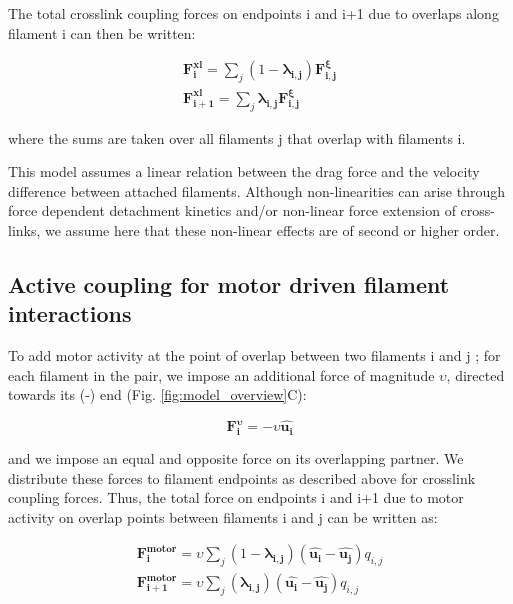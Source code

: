 \documentclass[10pt,letterpaper]{article}
\begin{document}
The total crosslink coupling forces on endpoints i and i+1 due to overlaps along filament i can then be written:

\begin{equation}
\label{eqn: total drag couple}
\begin{aligned}
\mathbf{F^{xl}_{i}} = \sum_j (1 - \mathbf{\lambda_{i,j}}) \mathbf{F^{\xi}_{i,j}} \\
\mathbf{F^{xl}_{i+1}} = \sum_j \mathbf{\lambda_{i,j}} \mathbf{F^{\xi}_{i,j}}
\end{aligned}
\end{equation}

where the sums are taken over all filaments j that overlap with filaments i.  

This model assumes a linear relation between the drag force and the velocity difference between attached filaments.   Although non-linearities can arise through force dependent detachment kinetics and/or non-linear force extension of cross-links, we assume here that these non-linear effects are of second or higher order. 

\subsection*{Active coupling for motor driven filament interactions}

To add motor activity at the point of overlap between two filaments i and j ; for each filament in the pair, we impose an additional force of magnitude $\upsilon$, directed towards its (-) end (Fig. \ref{fig:model_overview}C):

\begin{equation}
\label{eqn:directedmotorforce}
\mathbf{F^{\upsilon}_{i}}=-\upsilon \mathbf{\hat{u_i}}
\end{equation}

and we impose an equal and opposite force on its overlapping partner.  We distribute these forces to filament endpoints as described above for crosslink coupling forces.  Thus, the total force on endpoints i and i+1 due to motor activity on overlap points between filaments i and j can be written as:

\begin{equation}
\label{eqn:active}
\begin{aligned}
\mathbf{F^{motor}_{i}} = \upsilon \sum_j (1 - \mathbf{\lambda_{i,j}}) \left (\mathbf{\hat{u_{i}}} - \mathbf{\hat{u_j}} \right ) q_{i,j} \\
\mathbf{F^{motor}_{i+1}} = \upsilon \sum_j (\mathbf{\lambda_{i,j}}) \left (\mathbf{\hat{u_{i}}} - \mathbf{\hat{u_j}} \right ) q_{i,j} 
\end{aligned}
\end{equation}
\end{document}
